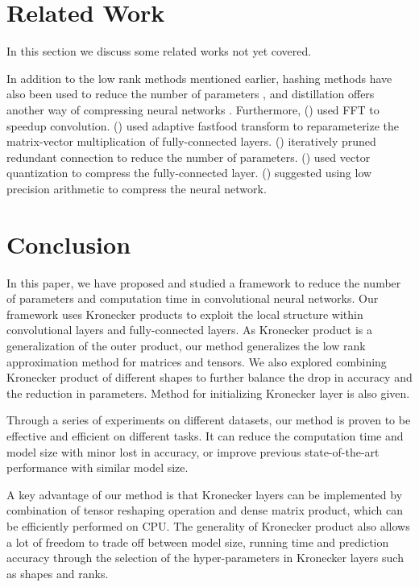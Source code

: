 \documentclass{article}
\begin{document}
\section{Related Work}
In this section we discuss some related works not yet covered.

In addition to the low rank methods mentioned earlier, hashing methods have also been used to reduce the number of parameters \cite{DBLP:conf/icml/ChenWTWC15,bakhtiary2015speeding}, and distillation offers another way of compressing neural networks \cite{hinton2015distilling}. Furthermore, \citeauthor{mathieu2013fast} (\citeyear{mathieu2013fast}) used FFT to speedup convolution. \citeauthor{DBLP:conf/aistats/YangWSS15} (\citeyear{DBLP:conf/aistats/YangWSS15}) used adaptive fastfood transform to reparameterize the matrix-vector multiplication of fully-connected layers.  \citeauthor{han2015learning} (\citeyear{han2015learning}) iteratively pruned redundant connection to reduce the number of parameters. \citeauthor{gong2014compressing} (\citeyear{gong2014compressing}) used vector quantization to compress the fully-connected layer.  \citeauthor{DBLP:conf/icml/GuptaAGN15} (\citeyear{DBLP:conf/icml/GuptaAGN15}) suggested using low precision arithmetic to compress the neural network.

\section{Conclusion}
In this paper, we have proposed and studied a framework to reduce the number of parameters and computation time in convolutional neural networks. Our
framework uses Kronecker products to exploit the local structure within convolutional layers and fully-connected layers. As Kronecker product is a
generalization of the outer product, our method generalizes the low rank approximation method for matrices and tensors. We also explored combining
Kronecker product of different shapes to further balance the drop in accuracy and the reduction in parameters. Method for initializing Kronecker layer is also given.

Through a series of experiments on different datasets, our method is proven to be effective and efficient on different tasks.
It can reduce the computation time and model size with minor lost in accuracy, or improve previous state-of-the-art performance with similar model size.

A key advantage of our method is that Kronecker layers can be implemented by combination of tensor reshaping operation and dense matrix product, which can be efficiently performed on CPU. The generality of Kronecker product also allows a lot of freedom to trade off between model size, running time and prediction accuracy through the selection of the hyper-parameters in Kronecker layers such as shapes and ranks.



\fontsize{9.5pt}{10.5pt} \selectfont

\end{document}
